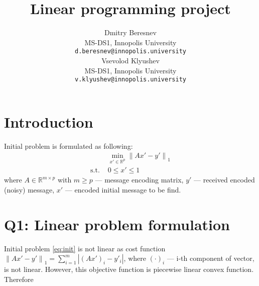\documentclass{article}
\title{Linear programming project}
\date{} 					%
\author{
  \hspace{1mm}Dmitry Beresnev \\
	MS-DS1, Innopolis University\\
	\texttt{d.beresnev@innopolis.university} \\
	\And{}
  \hspace{1mm}Vsevolod Klyushev \\
	MS-DS1, Innopolis University\\
	\texttt{v.klyushev@innopolis.university}
}
\def\R{\mathbb{R}}
\begin{document}
\maketitle

\section{Introduction}
Initial problem is formulated as following:
\begin{equation}\label{eq:init}
  \begin{aligned}
                 & \min\limits_{x' \in \R^p} {\| Ax'-y' \|}_1 \\
    \text{s.t. } & 0 \leq x' \leq 1
  \end{aligned}
\end{equation}
where $A \in \R^{m \times p}$ with $m \geq p$ --- message  encoding matrix,
$y'$ --- received encoded (noisy) message,
$x'$ --- encoded initial message to be find.

\section{Q1: Linear problem formulation}
Initial problem \cref{eq:init} is not linear as cost function
$ {\| Ax'-y' \|}_1 = \sum_{i=1}^{m} |{(Ax')}_i-y'_i|$,
where ${( \cdot )}_i$ --- i-th component of vector, is not linear. However, this objective function is piecewise linear convex function. Therefore
\end{document}
